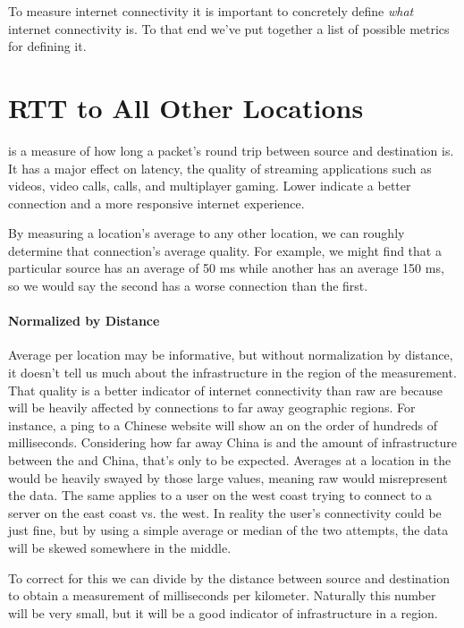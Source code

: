 To measure internet connectivity it is important to concretely define \textit{what} internet connectivity is. To that end we've put together a list of possible metrics for defining it.

\section{RTT to All Other Locations}
\label{sec:definition_rtt_to_everywhere}

\RTT is a measure of how long a packet's round trip between source and destination is. It has a major effect on latency, the quality of streaming applications such as videos, video calls, \voip calls, and multiplayer gaming. Lower \rtts indicate a better connection and a more responsive internet experience.

By measuring a location's average \rtt to any other location, we can roughly determine that connection's average quality. For example, we might find that a particular source has an average \rtt of 50 ms while another has an average 150 ms, so we would say the second has a worse connection than the first.

\paragraph{Normalized by Distance}
Average \rtt per location may be informative, but without normalization by distance, it doesn't tell us much about the infrastructure in the region of the measurement. That quality is a better indicator of internet connectivity than raw \rtts are because \rtts will be heavily affected by connections to far away geographic regions. For instance, a ping to a Chinese website will show an \rtt on the order of hundreds of milliseconds. Considering how far away China is and the amount of infrastructure between the \us and China, that's only to be expected. Averages at a location in the \us would be heavily swayed by those large values, meaning raw \rtt would misrepresent the data. The same applies to a user on the west coast trying to connect to a server on the east coast vs. the west. In reality the user's connectivity could be just fine, but by using a simple average or median of the two attempts, the data will be skewed somewhere in the middle.

To correct for this we can divide \rtt by the distance between source and destination to obtain a measurement of milliseconds per kilometer. Naturally this number will be very small, but it will be a good indicator of infrastructure in a region.

